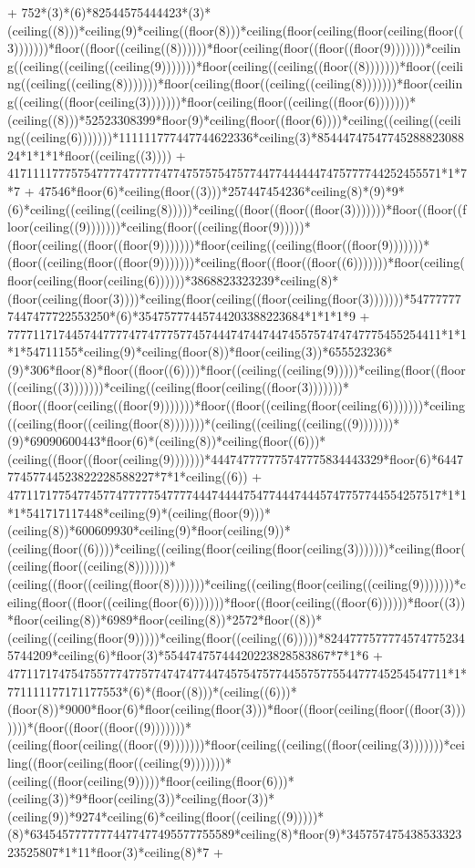 + 752*(3)*(6)*82544575444423*(3)*(ceiling((8)))*ceiling(9)*ceiling((floor(8)))*ceiling(floor(ceiling(floor(ceiling(floor((3)))))))*floor((floor((ceiling((8))))))*floor(ceiling(floor((floor((floor(9)))))))*ceiling((ceiling((ceiling((ceiling(9)))))))*floor(ceiling((ceiling((floor((8)))))))*floor((ceiling((ceiling((ceiling(8)))))))*floor(ceiling(floor((ceiling((ceiling(8)))))))*floor(ceiling((ceiling((floor(ceiling(3)))))))*floor(ceiling(floor((ceiling((floor(6)))))))*(ceiling((8)))*52523308399*floor(9)*ceiling(floor((floor(6))))*ceiling((ceiling((ceiling((ceiling(6)))))))*111111777447744622336*ceiling(3)*8544474754774528882308824*1*1*1*floor((ceiling((3)))) + 41711117775754777747777747747575754757744774444447475777744252455571*1*7*7 + 47546*floor(6)*ceiling(floor((3)))*257447454236*ceiling(8)*(9)*9*(6)*ceiling((ceiling((ceiling(8)))))*ceiling((floor((floor((floor(3)))))))*floor((floor((floor(ceiling((9)))))))*ceiling(floor((ceiling(floor(9)))))*(floor(ceiling((floor((floor(9)))))))*floor(ceiling((ceiling(floor((floor(9)))))))*(floor((ceiling(floor((floor(9)))))))*ceiling(floor((floor((floor((6)))))))*floor(ceiling(floor(ceiling(floor(ceiling(6))))))*3868823323239*ceiling(8)*(floor(ceiling(floor(3))))*ceiling(floor(ceiling((floor(ceiling(floor(3)))))))*547777777447477722553250*(6)*35475777445744203388223684*1*1*1*9 + 77771171744574477774774777577457444747447447455757474747775455254411*1*1*1*54711155*ceiling(9)*ceiling(floor(8))*floor(ceiling(3))*655523236*(9)*306*floor(8)*floor((floor((6))))*floor((ceiling((ceiling(9)))))*ceiling(floor((floor((ceiling((3)))))))*ceiling((ceiling(floor(ceiling((floor(3)))))))*(floor((floor(ceiling((floor(9)))))))*floor((floor((ceiling(floor(ceiling(6)))))))*ceiling((ceiling(floor((ceiling(floor(8)))))))*(ceiling((ceiling((ceiling((9)))))))*(9)*69090600443*floor(6)*(ceiling(8))*ceiling(floor((6)))*(ceiling((floor((floor(ceiling(9)))))))*444747777775747775834443329*floor(6)*644777457744523822228588227*7*1*ceiling((6)) + 47711717754774577477777547777444744447547744474445747757744554257517*1*1*1*541717117448*ceiling(9)*(ceiling(floor(9)))*(ceiling(8))*600609930*ceiling(9)*floor(ceiling(9))*(ceiling(floor((6))))*ceiling((ceiling(floor(ceiling(floor(ceiling(3)))))))*ceiling(floor((ceiling(floor((ceiling(8)))))))*(ceiling((floor((ceiling(floor(8)))))))*ceiling((ceiling(floor(ceiling((ceiling(9)))))))*ceiling(floor((floor((ceiling(floor(6)))))))*floor((floor(ceiling((floor(6))))))*floor((3))*floor(ceiling(8))*6989*floor(ceiling(8))*2572*floor((8))*(ceiling((ceiling(floor(9)))))*ceiling(floor((ceiling((6)))))*82447775777745747752345744209*ceiling(6)*floor(3)*55447475744420223828583867*7*1*6 + 477117174754755777477577474747744745754757744557577554477745254547711*1*771111177171177553*(6)*(floor((8)))*(ceiling((6)))*(floor(8))*9000*floor(6)*floor(ceiling(floor(3)))*floor((floor(ceiling(floor((floor(3)))))))*(floor((floor((floor((9)))))))*(ceiling(floor(ceiling((floor((9)))))))*floor(ceiling((ceiling((floor(ceiling(3)))))))*ceiling((floor(ceiling(floor((ceiling(9)))))))*(ceiling((floor(ceiling(9)))))*floor(ceiling(floor(6)))*(ceiling(3))*9*floor(ceiling(3))*ceiling(floor(3))*(ceiling(9))*9274*ceiling(6)*ceiling(floor((ceiling((9)))))*(8)*63454577777774477477495577755589*ceiling(8)*floor(9)*34575747543853332323525807*1*11*floor(3)*ceiling(8)*7 + 